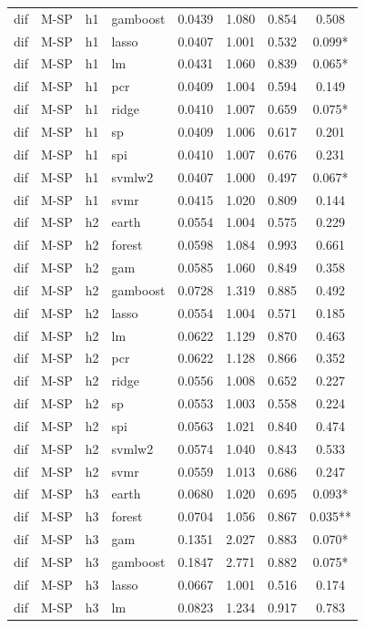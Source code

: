 \begin{ThreePartTable}
\begin{longtable}[t]{llclcccc}
dif & M-SP & h1 & gamboost & 0.0439 & 1.080 & 0.854 & 0.508\\
dif & M-SP & h1 & lasso & 0.0407 & 1.001 & 0.532 & 0.099*\\
dif & M-SP & h1 & lm & 0.0431 & 1.060 & 0.839 & 0.065*\\
dif & M-SP & h1 & pcr & 0.0409 & 1.004 & 0.594 & 0.149\\
dif & M-SP & h1 & ridge & 0.0410 & 1.007 & 0.659 & 0.075*\\
dif & M-SP & h1 & sp & 0.0409 & 1.006 & 0.617 & 0.201\\
dif & M-SP & h1 & spi & 0.0410 & 1.007 & 0.676 & 0.231\\
dif & M-SP & h1 & svmlw2 & 0.0407 & 1.000 & 0.497 & 0.067*\\
dif & M-SP & h1 & svmr & 0.0415 & 1.020 & 0.809 & 0.144\\
\addlinespace
dif & M-SP & h2 & earth & 0.0554 & 1.004 & 0.575 & 0.229\\
dif & M-SP & h2 & forest & 0.0598 & 1.084 & 0.993 & 0.661\\
dif & M-SP & h2 & gam & 0.0585 & 1.060 & 0.849 & 0.358\\
dif & M-SP & h2 & gamboost & 0.0728 & 1.319 & 0.885 & 0.492\\
dif & M-SP & h2 & lasso & 0.0554 & 1.004 & 0.571 & 0.185\\
dif & M-SP & h2 & lm & 0.0622 & 1.129 & 0.870 & 0.463\\
dif & M-SP & h2 & pcr & 0.0622 & 1.128 & 0.866 & 0.352\\
dif & M-SP & h2 & ridge & 0.0556 & 1.008 & 0.652 & 0.227\\
dif & M-SP & h2 & sp & 0.0553 & 1.003 & 0.558 & 0.224\\
dif & M-SP & h2 & spi & 0.0563 & 1.021 & 0.840 & 0.474\\
dif & M-SP & h2 & svmlw2 & 0.0574 & 1.040 & 0.843 & 0.533\\
dif & M-SP & h2 & svmr & 0.0559 & 1.013 & 0.686 & 0.247\\
\addlinespace
dif & M-SP & h3 & earth & 0.0680 & 1.020 & 0.695 & 0.093*\\
dif & M-SP & h3 & forest & 0.0704 & 1.056 & 0.867 & 0.035**\\
dif & M-SP & h3 & gam & 0.1351 & 2.027 & 0.883 & 0.070*\\
dif & M-SP & h3 & gamboost & 0.1847 & 2.771 & 0.882 & 0.075*\\
dif & M-SP & h3 & lasso & 0.0667 & 1.001 & 0.516 & 0.174\\
dif & M-SP & h3 & lm & 0.0823 & 1.234 & 0.917 & 0.783\\

\end{longtable}
\end{ThreePartTable}
